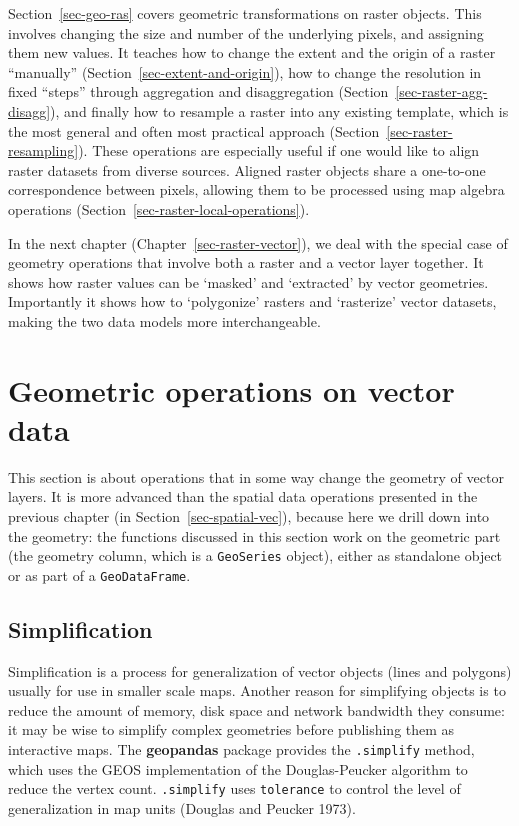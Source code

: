 \documentclass[
  letterpaper,
]{krantz}
\begin{document}
Section~\ref{sec-geo-ras} covers geometric transformations on raster
objects. This involves changing the size and number of the underlying
pixels, and assigning them new values. It teaches how to change the
extent and the origin of a raster ``manually''
(Section~\ref{sec-extent-and-origin}), how to change the resolution in
fixed ``steps'' through aggregation and disaggregation
(Section~\ref{sec-raster-agg-disagg}), and finally how to resample a
raster into any existing template, which is the most general and often
most practical approach (Section~\ref{sec-raster-resampling}). These
operations are especially useful if one would like to align raster
datasets from diverse sources. Aligned raster objects share a one-to-one
correspondence between pixels, allowing them to be processed using map
algebra operations (Section~\ref{sec-raster-local-operations}).

In the next chapter (Chapter~\ref{sec-raster-vector}), we deal with the
special case of geometry operations that involve both a raster and a
vector layer together. It shows how raster values can be `masked' and
`extracted' by vector geometries. Importantly it shows how to
`polygonize' rasters and `rasterize' vector datasets, making the two
data models more interchangeable.

\section{Geometric operations on vector data}\label{sec-geo-vec}

This section is about operations that in some way change the geometry of
vector layers. It is more advanced than the spatial data operations
presented in the previous chapter (in Section~\ref{sec-spatial-vec}),
because here we drill down into the geometry: the functions discussed in
this section work on the geometric part (the geometry column, which is a
\texttt{GeoSeries} object), either as standalone object or as part of a
\texttt{GeoDataFrame}.

\subsection{Simplification}\label{sec-simplification}

Simplification is a process for generalization of vector objects (lines
and polygons) usually for use in smaller scale maps. Another reason for
simplifying objects is to reduce the amount of memory, disk space and
network bandwidth they consume: it may be wise to simplify complex
geometries before publishing them as interactive maps. The
\textbf{geopandas} package provides the \texttt{.simplify} method, which
uses the GEOS implementation of the Douglas-Peucker algorithm to reduce
the vertex count. \texttt{.simplify} uses \texttt{tolerance} to control
the level of generalization in map units (Douglas and Peucker 1973).
\end{document}
